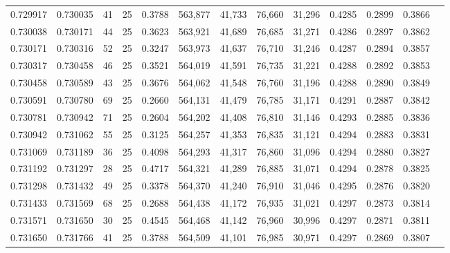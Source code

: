 \begin{tabular}{rrrrrrrrrrrrr}
0.729917 & 0.730035 &    41 &  25 &                                     0.3788 & 563,877 &  41,733 &  76,660 &  31,296 & 0.4285 & 0.2899 & 0.3866 \\
0.730038 & 0.730171 &    44 &  25 &                                     0.3623 & 563,921 &  41,689 &  76,685 &  31,271 & 0.4286 & 0.2897 & 0.3862 \\
0.730171 & 0.730316 &    52 &  25 &                                     0.3247 & 563,973 &  41,637 &  76,710 &  31,246 & 0.4287 & 0.2894 & 0.3857 \\
0.730317 & 0.730458 &    46 &  25 &                                     0.3521 & 564,019 &  41,591 &  76,735 &  31,221 & 0.4288 & 0.2892 & 0.3853 \\
0.730458 & 0.730589 &    43 &  25 &                                     0.3676 & 564,062 &  41,548 &  76,760 &  31,196 & 0.4288 & 0.2890 & 0.3849 \\
0.730591 & 0.730780 &    69 &  25 &                                     0.2660 & 564,131 &  41,479 &  76,785 &  31,171 & 0.4291 & 0.2887 & 0.3842 \\
0.730781 & 0.730942 &    71 &  25 &                                     0.2604 & 564,202 &  41,408 &  76,810 &  31,146 & 0.4293 & 0.2885 & 0.3836 \\
0.730942 & 0.731062 &    55 &  25 &                                     0.3125 & 564,257 &  41,353 &  76,835 &  31,121 & 0.4294 & 0.2883 & 0.3831 \\
0.731069 & 0.731189 &    36 &  25 &                                     0.4098 & 564,293 &  41,317 &  76,860 &  31,096 & 0.4294 & 0.2880 & 0.3827 \\
0.731192 & 0.731297 &    28 &  25 &                                     0.4717 & 564,321 &  41,289 &  76,885 &  31,071 & 0.4294 & 0.2878 & 0.3825 \\
0.731298 & 0.731432 &    49 &  25 &                                     0.3378 & 564,370 &  41,240 &  76,910 &  31,046 & 0.4295 & 0.2876 & 0.3820 \\
0.731433 & 0.731569 &    68 &  25 &                                     0.2688 & 564,438 &  41,172 &  76,935 &  31,021 & 0.4297 & 0.2873 & 0.3814 \\
0.731571 & 0.731650 &    30 &  25 &                                     0.4545 & 564,468 &  41,142 &  76,960 &  30,996 & 0.4297 & 0.2871 & 0.3811 \\
0.731650 & 0.731766 &    41 &  25 &                                     0.3788 & 564,509 &  41,101 &  76,985 &  30,971 & 0.4297 & 0.2869 & 0.3807 \\

\end{tabular}
